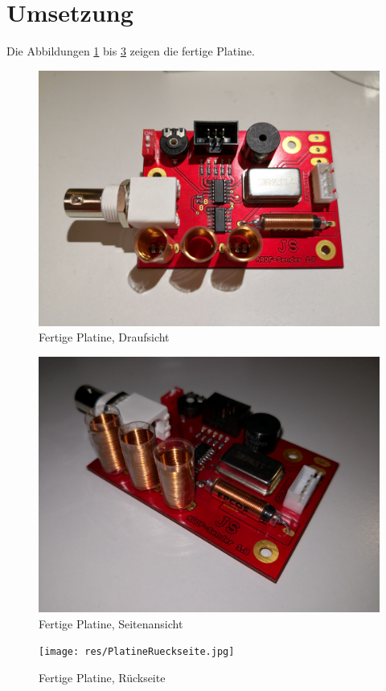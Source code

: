 \section{Umsetzung}
Die Abbildungen \ref{bild1} bis \ref{bild3} zeigen die fertige Platine. 
\begin{figure}[H]\centering
	\includegraphics[width=16cm]{res/PlatineDraufsicht.jpg}
	\caption{Fertige Platine, Draufsicht}
	\label{bild1}
\end{figure}
\begin{figure}[H]\centering
	\includegraphics[width=16cm]{res/PlatineSeite.jpg}
	\caption{Fertige Platine, Seitenansicht}
	\label{bild2}
\end{figure}
\begin{figure}[H]\centering
	\texttt{[image: res/PlatineRueckseite.jpg]}
	\caption{Fertige Platine, Rückseite}
	\label{bild3}
\end{figure}

